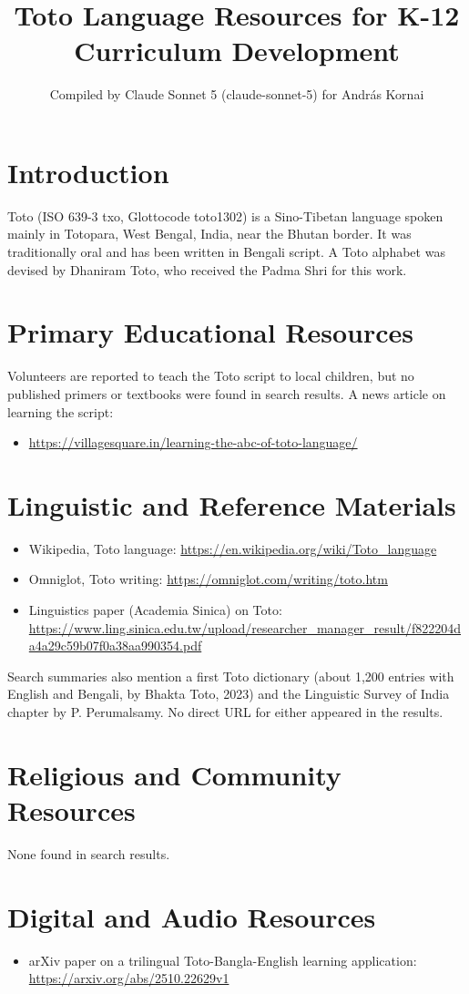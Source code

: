 \documentclass[12pt]{article}
\title{Toto Language Resources for K-12 Curriculum Development}
\author{Compiled by Claude Sonnet 5 (claude-sonnet-5) for Andr\'as Kornai}
\date{}
\begin{document}
\maketitle
\section{Introduction}
Toto (ISO 639-3 txo, Glottocode toto1302) is a Sino-Tibetan language spoken mainly in Totopara, West Bengal, India, near the Bhutan border. It was traditionally oral and has been written in Bengali script. A Toto alphabet was devised by Dhaniram Toto, who received the Padma Shri for this work.
\section{Primary Educational Resources}
Volunteers are reported to teach the Toto script to local children, but no published primers or textbooks were found in search results. A news article on learning the script:
\begin{itemize}
\item \url{https://villagesquare.in/learning-the-abc-of-toto-language/}
\end{itemize}
\section{Linguistic and Reference Materials}
\begin{itemize}
\item Wikipedia, Toto language: \url{https://en.wikipedia.org/wiki/Toto_language}
\item Omniglot, Toto writing: \url{https://omniglot.com/writing/toto.htm}
\item Linguistics paper (Academia Sinica) on Toto: \url{https://www.ling.sinica.edu.tw/upload/researcher_manager_result/f822204da4a29c59b07f0a38aa990354.pdf}
\end{itemize}
Search summaries also mention a first Toto dictionary (about 1,200 entries with English and Bengali, by Bhakta Toto, 2023) and the Linguistic Survey of India chapter by P. Perumalsamy. No direct URL for either appeared in the results.
\section{Religious and Community Resources}
None found in search results.
\section{Digital and Audio Resources}
\begin{itemize}
\item arXiv paper on a trilingual Toto-Bangla-English learning application: \url{https://arxiv.org/abs/2510.22629v1}
\end{itemize}
\end{document}
